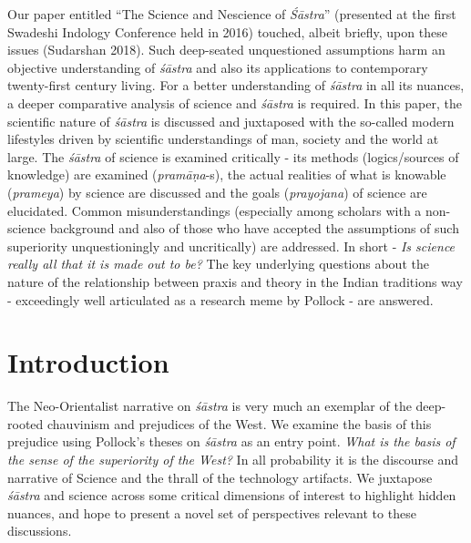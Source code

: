 Our paper entitled “The Science and Nescience of \textit{Śāstra}” (presented at the first Swadeshi Indology Conference held in 2016) touched, albeit briefly, upon these issues (Sudarshan 2018). Such deep-seated unquestioned assumptions harm an objective understanding of \textit{śāstra} and also its applications to contemporary twenty-first century living. For a better understanding of \textit{śāstra} in all its nuances, a deeper comparative analysis of science and \textit{śāstra} is required. In this paper, the scientific nature of \textit{śāstra} is discussed and juxtaposed with the so-called modern lifestyles driven by scientific understandings of man, society and the world at large. The \textit{śāstra} of science is examined critically - its methods (logics/sources of knowledge) are examined (\textit{pramāṇa}-s), the actual realities of what is knowable (\textit{prameya}) by science are discussed and the goals (\textit{prayojana}) of science are elucidated. Common misunderstandings (especially among scholars with a non-science background and also of those who have accepted the assumptions of such superiority unquestioningly and uncritically) are addressed. In short - \textit{Is science really all that it is made out to be?} The key underlying questions about the nature of the relationship between praxis and theory in the Indian traditions way - exceedingly well articulated as a research meme by Pollock - are answered.

\section*{Introduction}

The Neo-Orientalist narrative on \textit{śāstra} is very much an exemplar of the deep-rooted chauvinism and prejudices of the West. We examine the basis of this prejudice using Pollock’s theses on \textit{śāstra} as an entry point. \textit{What is the basis of the sense of the superiority of the West?} In all probability it is the discourse and narrative of Science and the thrall of the technology artifacts. We juxtapose \textit{śāstra} and science across some critical dimensions of interest to highlight hidden nuances, and hope to present a novel set of perspectives relevant to these discussions.

